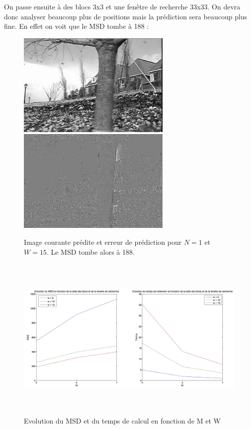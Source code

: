 \documentclass[a4paper, 12pt]{article}
\begin{document}
On passe ensuite à des blocs 3x3 et une fenêtre de recherche 33x33. On devra donc analyser beaucoup plus de positions mais la prédiction sera beaucoup plus fine. En effet on voit que le MSD tombe à 188 :

\begin{figure}[H]
	\centering
	\includegraphics[height=5cm]{../Resultats/Garden/garden_pred_n_1_w_15.jpg}
	\includegraphics[height=5cm]{../Resultats/Garden/garden_error_n_1_w_15.jpg}
	\caption{Image courante prédite et erreur de prédiction pour $N=1$ et $W=15$. Le MSD tombe alors à 188.}
	\label{fig:garden_1_15}
\end{figure}

\begin{figure}[H]
	\centering
	\includegraphics[height=8cm]{../Resultats/Garden/garden_graph.jpg}
	\caption{Evolution du MSD et du temps de calcul en fonction de M et W}
	\label{fig:garden_graph}
\end{figure}
\end{document}
